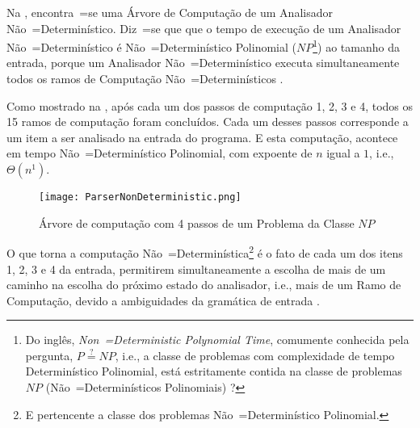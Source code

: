 
Na ,
encontra~=se uma Árvore de Computação de um Analisador Não~=Determinístico.
Diz~=se que que o tempo de execução de um Analisador Não~=Determinístico é Não~=Determinístico Polinomial ($NP$\footnote{
Do inglês, \textit{Non~=Deterministic Polynomial Time},
comumente conhecida pela pergunta,
$P \stackrel{?}{=} NP$, i.e.,
a classe de problemas com complexidade de tempo Determinístico Polinomial,
está estritamente contida na classe de problemas $NP$ (Não~=Determinísticos Polinomiais) \cite{computationalComplexityAuroraBarak}?
})
ao tamanho da entrada,
porque um Analisador Não~=Determinístico executa simultaneamente todos os ramos de Computação Não~=Determinísticos \cite{hopcroftBook}.

Como mostrado na ,
após cada um dos passos de computação 1,
2, 3 e 4,
todos os 15 ramos de computação foram concluídos.
Cada um desses passos corresponde a um item a ser analisado na entrada do programa.
E esta computação,
acontece em tempo Não~=Determinístico Polinomial,
com expoente de $n$ igual a $1$,
i.e.,
$\Theta(n^1)$.
\begin{figure}[!htb]
\caption{Árvore de computação com 4 passos  de um Problema da Classe $NP$}
\label{ParserNonDeterministic}
\centering
\texttt{[image: ParserNonDeterministic.png]}
\end{figure}

O que torna a computação Não~=Determinística\footnote{
E pertencente a classe dos problemas Não~=Determinístico Polinomial.
} é o fato de cada um dos itens 1,
2, 3 e 4 da entrada,
permitirem simultaneamente a escolha de mais de um caminho na escolha do próximo estado do analisador,
i.e.,
mais de um Ramo de Computação,
devido a ambiguidades da gramática de entrada \cite{detectingAmbiguityInGrammars,antlrBookTerrentParr}.


